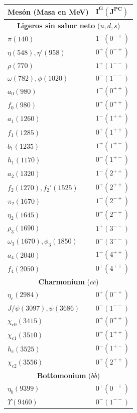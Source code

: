 {

\centering

\centering
\renewcommand{\arraystretch}{1.2}
\begin{tabular}{ll}
\toprule
\textbf{Mesón (Masa en MeV)} & $\mathbf{I^G(J^{PC})}$ \\ 
\midrule
\multicolumn{2}{c}{\textbf{Ligeros sin sabor neto} ($u, d, s$)} \\
\midrule
$\pi(140)$ & $1^-(0^{-+})$ \\
$\eta(548), \eta'(958)$ & $0^+(0^{-+})$ \\
$\rho(770)$ & $1^+(1^{--})$ \\
$\omega(782), \phi(1020)$ & $0^-(1^{--})$ \\
$a_0(980)$ & $1^-(0^{++})$ \\
$f_0(980)$ & $0^+(0^{++})$ \\
$a_1(1260)$ & $1^-(1^{++})$ \\
$f_1(1285)$ & $0^+(1^{++})$ \\
$b_1(1235)$ & $1^+(1^{+-})$ \\
$h_1(1170)$ & $0^-(1^{+-})$ \\
$a_2(1320)$ & $1^-(2^{++})$ \\
$f_2(1270), f_2'(1525)$ & $0^+(2^{++})$ \\
$\pi_2(1670)$ & $1^-(2^{-+})$ \\
$\eta_2(1645)$ & $0^+(2^{-+})$ \\
$\rho_3(1690)$ & $1^+(3^{--})$ \\
$\omega_3(1670), \phi_3(1850)$ & $0^-(3^{--})$ \\
$a_4(2040)$ & $1^-(4^{++})$ \\
$f_4(2050)$ & $0^+(4^{++})$ \\
\midrule
\multicolumn{2}{c}{\textbf{Charmonium} ($c\bar{c}$)} \\
\midrule
$\eta_c(2984)$ & $0^+(0^{-+})$ \\
$J/\psi(3097), \psi(3686)$ & $0^-(1^{--})$ \\
$\chi_{c0}(3415)$ & $0^+(0^{++})$ \\
$\chi_{c1}(3510)$ & $0^+(1^{++})$ \\
$h_c(3525)$ & $0^-(1^{+-})$ \\
$\chi_{c2}(3556)$ & $0^+(2^{++})$ \\
\midrule
\multicolumn{2}{c}{\textbf{Bottomonium} ($b\bar{b}$)} \\
\midrule
$\eta_b(9399)$ & $0^+(0^{-+})$ \\
$\Upsilon(9460)$ & $0^-(1^{--})$ \\

\end{tabular}}
